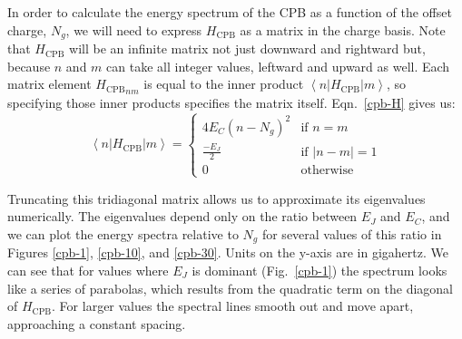 \documentclass[twocolumn]{revtex4}
\newcommand{\innerp}[3]{\textstyle\left< #1 \left| #2 \right| #3 \right>}
\begin{document}
In order to calculate the energy spectrum of the CPB as a function of
the offset charge, $N_g$, we will need to express $H_{\text{CPB}}$ as
a matrix in the charge basis. Note that $H_{\text{CPB}}$ will be an
infinite matrix not just downward and rightward but, because $n$ and
$m$ can take all integer values, leftward and upward as well. Each
matrix element ${H_{\text{CPB}}}_{nm}$ is equal to the inner product
$\innerp{n}{H_{\text{CPB}}}{m}$, so specifying those inner products
specifies the matrix itself. Eqn.~\ref{cpb-H} gives us:
\begin{equation}
  \innerp{n}{H_{\text{CPB}}}{m} = 
  \begin{cases}
    4E_C(n-N_g)^2 & \text{if $n=m$} \\
    \frac{-E_J}{2} & \text{if $|n-m|=1$}\\
    0 & \text{otherwise}
  \end{cases}
\end{equation}

Truncating this tridiagonal matrix allows us to approximate its
eigenvalues numerically. The eigenvalues depend only on the ratio
between $E_J$ and $E_C$, and we can plot the energy spectra relative
to $N_g$ for several values of this ratio in Figures \ref{cpb-1},
\ref{cpb-10}, and \ref{cpb-30}. Units on the y-axis are in
gigahertz. We can see that for values where $E_J$ is dominant
(Fig.~\ref{cpb-1}) the spectrum looks like a series of parabolas,
which results from the quadratic term on the diagonal of
$H_{\text{CPB}}$. For larger values the spectral lines smooth out and
move apart, approaching a constant spacing.
\end{document}
